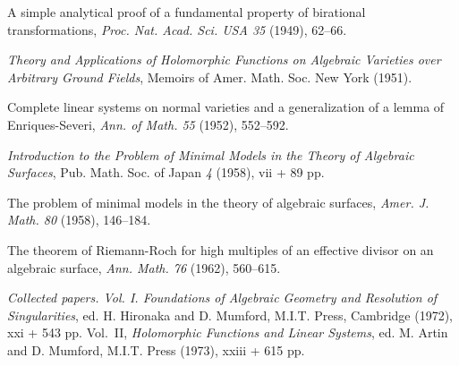 {\noindent\hangindent=25bp\hspace*{6bp}%
A simple analytical proof of a fundamental property of birational transformations, \emph{Proc. Nat. Acad. Sci. USA 35} (1949), 62--66.\par
\noindent\hangindent=25bp\hspace*{6bp}%
\emph{Theory and Applications of Holomorphic Functions on Algebraic Varieties over Arbitrary Ground Fields}, Memoirs of Amer. Math. Soc. New York (1951).\par
\noindent\hangindent=25bp\hspace*{6bp}%
Complete linear systems on normal varieties and a generalization of a lemma of Enriques-Severi, \emph{Ann. of Math. 55} (1952), 552--592.\par
\noindent\hangindent=25bp\hspace*{6bp}%
\emph{Introduction to the Problem of Minimal Models in the Theory of Algebraic Surfaces}, Pub. Math. Soc. of Japan \emph{4} (1958), vii + 89 pp.\par
\noindent\hangindent=25bp\hspace*{6bp}%
The problem of minimal models in the theory of algebraic surfaces, \emph{Amer. J. Math. 80} (1958), 146--184.\par
\noindent\hangindent=25bp\hspace*{6bp}%
The theorem of Riemann-Roch for high multiples of an effective divisor on an algebraic surface, \emph{Ann. Math. 76} (1962), 560--615.\par
\noindent\hangindent=25bp\hspace*{6bp}%
\emph{Collected papers. Vol. I. Foundations of Algebraic Geometry and Resolution of Singularities}, ed. H. Hironaka and D. Mumford, M.I.T. Press, Cambridge (1972), xxi + 543 pp. Vol.~II, \emph{Holomorphic Functions and Linear Systems}, ed. M. Artin and D. Mumford, M.I.T. Press (1973), xxiii + 615 pp.\par
\noindent\hangindent=25bp\hspace*{6bp}%
}
